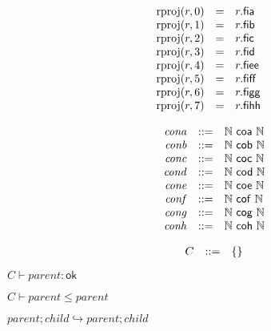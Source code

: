 $$
\begin{array}{@{}lcl@{}l@{}}
{\mathrm{rproj}}(r, 0) &=& r{.}\mathsf{fia} \\
{\mathrm{rproj}}(r, 1) &=& r{.}\mathsf{fib} \\
{\mathrm{rproj}}(r, 2) &=& r{.}\mathsf{fic} \\
{\mathrm{rproj}}(r, 3) &=& r{.}\mathsf{fid} \\
{\mathrm{rproj}}(r, 4) &=& r{.}\mathsf{fiee} \\
{\mathrm{rproj}}(r, 5) &=& r{.}\mathsf{fiff} \\
{\mathrm{rproj}}(r, 6) &=& r{.}\mathsf{figg} \\
{\mathrm{rproj}}(r, 7) &=& r{.}\mathsf{fihh} \\
\end{array}
$$

\vspace{1ex}

$$
\begin{array}{@{}lrrl@{}l@{}}
& {\mathit{cona}} &::=& \mathbb{N}~\mathsf{coa}~\mathbb{N} \\
& {\mathit{conb}} &::=& \mathbb{N}~\mathsf{cob}~\mathbb{N} \\
& {\mathit{conc}} &::=& \mathbb{N}~\mathsf{coc}~\mathbb{N} \\
& {\mathit{cond}} &::=& \mathbb{N}~\mathsf{cod}~\mathbb{N} \\
& {\mathit{cone}} &::=& \mathbb{N}~\mathsf{coe}~\mathbb{N} \\
& {\mathit{conf}} &::=& \mathbb{N}~\mathsf{cof}~\mathbb{N} \\
& {\mathit{cong}} &::=& \mathbb{N}~\mathsf{cog}~\mathbb{N} \\
& {\mathit{conh}} &::=& \mathbb{N}~\mathsf{coh}~\mathbb{N} \\
\end{array}
$$

\vspace{1ex}

$$
\begin{array}{@{}lrrl@{}l@{}}
& C &::=& \{ \begin{array}[t]{@{}l@{}l@{}}
 \}\end{array} \\
\end{array}
$$

$\boxed{C \vdash {\mathit{parent}} : \mathsf{ok}}$

$\boxed{C \vdash {\mathit{parent}} \leq {\mathit{parent}}}$

$\boxed{{\mathit{parent}} ; {\mathit{child}} \hookrightarrow {\mathit{parent}} ; {\mathit{child}}}$

